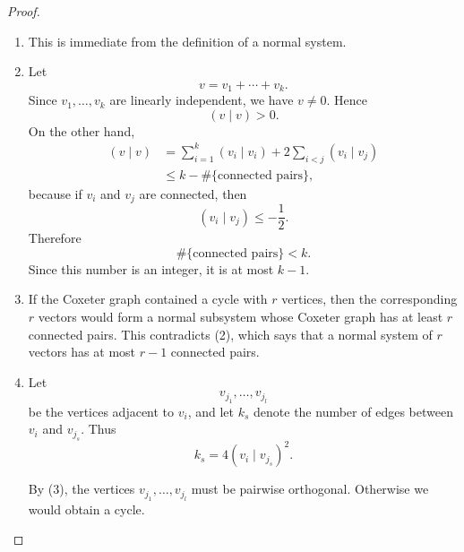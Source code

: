 \begin{proof}
    \begin{enumerate}
        \item This is immediate from the definition of a normal system.

        \item Let
              \[
                  v=v_1+\cdots+v_k.
              \]
              Since \(v_1,\dots,v_k\) are linearly independent, we have \(v\neq 0\).
              Hence
              \[
                  (v\mid v)>0.
              \]
              On the other hand,
              \[
                  \begin{aligned}
                      (v\mid v)
                       & =
                      \sum_{i=1}^k (v_i\mid v_i)
                      +
                      2\sum_{i<j}(v_i\mid v_j) \\
                       & \leq
                      k-\#\{\text{connected pairs}\},
                  \end{aligned}
              \]
              because if \(v_i\) and \(v_j\) are connected, then
              \[
                  (v_i\mid v_j)\leq -\frac{1}{2}.
              \]
              Therefore
              \[
                  \#\{\text{connected pairs}\}<k.
              \]
              Since this number is an integer, it is at most \(k-1\).

        \item If the Coxeter graph contained a cycle with \(r\) vertices, then the
              corresponding \(r\) vectors would form a normal subsystem whose Coxeter
              graph has at least \(r\) connected pairs. This contradicts \textup{(2)},
              which says that a normal system of \(r\) vectors has at most \(r-1\)
              connected pairs.

        \item Let
              \[
                  v_{j_1},\dots,v_{j_l}
              \]
              be the vertices adjacent to \(v_i\), and let \(k_s\) denote the number of
              edges between \(v_i\) and \(v_{j_s}\). Thus
              \[
                  k_s=4(v_i\mid v_{j_s})^2.
              \]

              By \textup{(3)}, the vertices \(v_{j_1},\dots,v_{j_l}\) must be pairwise
              orthogonal. Otherwise we would obtain a cycle.


\end{enumerate}
\end{proof}
